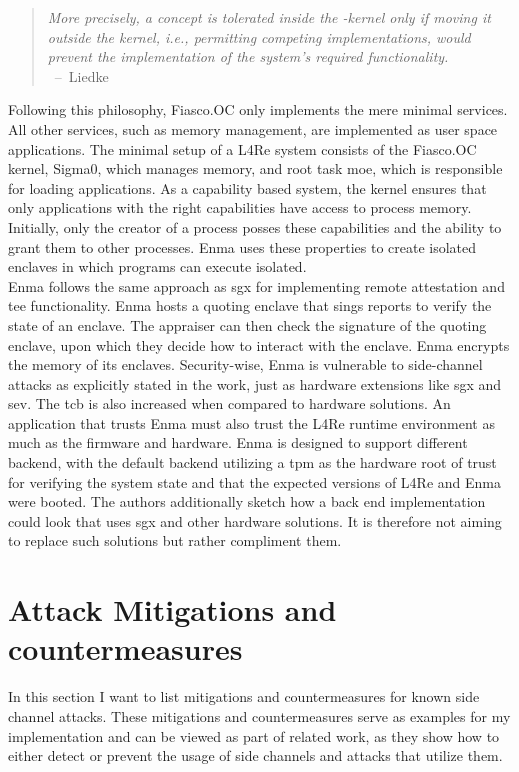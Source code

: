 \begin{quote}
    \textit{ More precisely, a concept is tolerated inside the \mu-kernel only
        if moving it outside the kernel, i.e., permitting competing
        implementations, would prevent the implementation of the system's
        required functionality. \\
    } \mbox{ -- Liedke\cite{liedtke1995micro}}
\end{quote}

Following this philosophy, Fiasco.OC only implements the mere minimal services.
All other services, such as memory management, are implemented as user space
applications. The minimal setup of a L4Re system consists of the Fiasco.OC
kernel, Sigma0, which manages memory, and root task moe, which is responsible
for loading applications. As a capability based system, the kernel ensures that
only applications with the right capabilities have access to process memory.
Initially, only the creator of a process posses these capabilities and the
ability to grant them to other processes. Enma uses these properties to create
isolated enclaves in which programs can execute isolated.\\

Enma follows the same approach as \gls{sgx} for implementing remote attestation
and \gls{tee} functionality. Enma hosts a quoting enclave that sings reports to
verify the state of an enclave. The appraiser can then check the signature of
the quoting enclave, upon which they decide how to interact with the enclave.
Enma encrypts the memory of its enclaves. Security-wise, Enma is vulnerable to
side-channel attacks as explicitly stated in the work, just as hardware
extensions like \gls{sgx} and \gls{sev}. The \gls{tcb} is also increased when
compared to hardware solutions. An application that trusts Enma must also trust
the L4Re runtime environment as much as the firmware and hardware. Enma is
designed to support different backend, with the default backend utilizing a
\gls{tpm} as the hardware root of trust for verifying the system state and that
the expected versions of L4Re and Enma were booted. The authors additionally
sketch how a back end implementation could look that uses \gls{sgx} and other
hardware solutions. It is therefore not aiming to replace such solutions but
rather compliment them.

\section{Attack Mitigations and countermeasures}
\label{sec:20:mitigations}
In this section I want to list mitigations and countermeasures for known
side channel attacks. These mitigations and countermeasures serve as examples
for my implementation and can be viewed as part of related work, as they show
how to either detect or prevent the usage of side channels and attacks that
utilize them.

